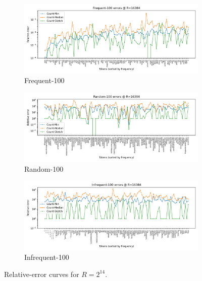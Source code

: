 \documentclass[11pt]{article}
\begin{document}
\begin{figure}[H]
  \centering
  \begin{subfigure}[t]{0.32\linewidth}
    \centering
    \includegraphics[width=\linewidth]{../outputs/a2/errors_R16384_Frequent_100.png}
    \caption{Frequent-100}
  \end{subfigure}
  \hfill
  \begin{subfigure}[t]{0.32\linewidth}
    \centering
    \includegraphics[width=\linewidth]{../outputs/a2/errors_R16384_Random_100.png}
    \caption{Random-100}
  \end{subfigure}
  \hfill
  \begin{subfigure}[t]{0.32\linewidth}
    \centering
    \includegraphics[width=\linewidth]{../outputs/a2/errors_R16384_Infrequent_100.png}
    \caption{Infrequent-100}
  \end{subfigure}
  \caption{Relative-error curves for $R=2^{14}$.}
  \label{fig:error-r16384}
\end{figure}
\end{document}
